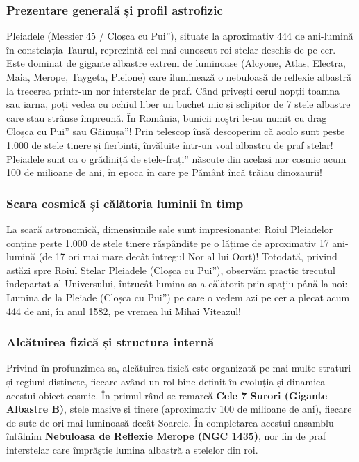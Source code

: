 \subsubsection*{Prezentare generală și profil astrofizic}
Pleiadele (Messier 45 / \quotedblbase{}Cloșca cu Pui\textquotedblright{}), situate la aproximativ 444 de ani-lumină în constelația Taurul, reprezintă cel mai cunoscut roi stelar deschis de pe cer. Este dominat de gigante albastre extrem de luminoase (Alcyone, Atlas, Electra, Maia, Merope, Taygeta, Pleione) care iluminează o nebuloasă de reflexie albastră la trecerea printr-un nor interstelar de praf. Când privești cerul nopții toamna sau iarna, poți vedea cu ochiul liber un buchet mic și sclipitor de 7 stele albastre care stau strânse împreună. În România, bunicii noștri le-au numit cu drag \quotedblbase{}Cloșca cu Pui\textquotedblright{} sau \quotedblbase{}Găinușa\textquotedblright{}! Prin telescop însă descoperim că acolo sunt peste 1.000 de stele tinere și fierbinți, învăluite într-un voal albastru de praf stelar! Pleiadele sunt ca o \quotedblbase{}grădiniță de stele-frați\textquotedblright{} născute din același nor cosmic acum 100 de milioane de ani, în epoca în care pe Pământ încă trăiau dinozaurii!

\subsubsection*{Scara cosmică și călătoria luminii în timp}
La scară astronomică, dimensiunile sale sunt impresionante: Roiul Pleiadelor conține peste 1.000 de stele tinere răspândite pe o lățime de aproximativ 17 ani-lumină (de 17 ori mai mare decât întregul Nor al lui Oort)! Totodată, privind astăzi spre Roiul Stelar Pleiadele (\quotedblbase{}Cloșca cu Pui\textquotedblright{}), observăm practic trecutul îndepărtat al Universului, întrucât lumina sa a călătorit prin spațiu până la noi: Lumina de la Pleiade (\quotedblbase{}Cloșca cu Pui\textquotedblright{}) pe care o vedem azi pe cer a plecat acum 444 de ani, în anul 1582, pe vremea lui Mihai Viteazul!

\subsubsection*{Alcătuirea fizică și structura internă}
Privind în profunzimea sa, alcătuirea fizică este organizată pe mai multe straturi și regiuni distincte, fiecare având un rol bine definit în evoluția și dinamica acestui obiect cosmic. În primul rând se remarcă \textbf{Cele 7 Surori (Gigante Albastre B)}, stele masive și tinere (aproximativ 100 de milioane de ani), fiecare de sute de ori mai luminoasă decât Soarele. În completarea acestui ansamblu întâlnim \textbf{Nebuloasa de Reflexie Merope (NGC 1435)}, nor fin de praf interstelar care împrăștie lumina albastră a stelelor din roi.

